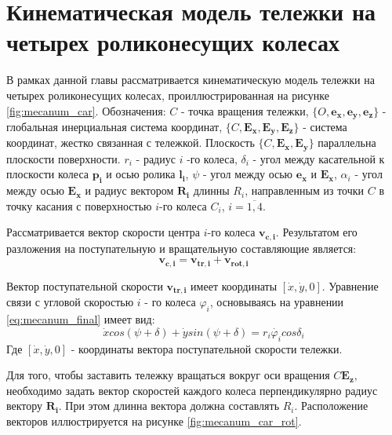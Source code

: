 \documentclass[oneside,final,14pt]{extreport}
\newcommand{\cmmnt}[1]{\ignorespaces}
\newcommand{\bs}{\boldsymbol}
\begin{document}
\chapter{Кинематическая модель тележки на четырех роликонесущих колесах}
В рамках данной главы рассматривается кинематическую модель тележки на четырех роликонесущих колесах, проиллюстрированная на рисунке  \ref{fig:mecanum_car}. Обозначения: $C$ - точка вращения тележки, $\{O,\bs{e_{x}},\bs{e_{y}},\bs{e_{z}}\}$ - глобальная инерциальная система координат, $\{C,\bs{E_{x}},\bs{E_{y}},\bs{E_{z}}\}$ - система координат, жестко связанная с тележкой. Плоскость $\{C,\bs{E_{x}},\bs{E_{y}}\}$ параллельна плоскости поверхности.  $r_{i}$ - радиус $i$ -го колеса, $\delta_{i}$ - угол между касательной к плоскости колеса $\bs{p_{i}}$ и осью ролика $\bs{l_{i}}$\cmmnt{, $\delta_{i} = \widehat{p_{i} l_{i}}$ }, $\psi$ - угол между осью $\bs{e_{x}}$ и $\bs{E_{x}}$\cmmnt{, $\psi$ = $\widehat{e_{x}E{x}}$}, $\alpha_{i}$ - угол между осью $\bs{E_{x}}$ и радиус вектором $\bs{R_{i}}$ длинны $R_{i}$, направленным из точки $C$ в точку касания с поверхностью $i$-го колеса $C_{i}$\cmmnt{,$\alpha_{i} = \widehat{E_{x}\overrightarrow{C C_{i}}}$}, $i=\overline{1,4}$. 

\begin{figure}[H]
\end{figure}

Рассматривается вектор скорости центра $i$-го колеса $\bs{v_{c,i}}$. Результатом его разложения на поступательную и вращательную составляющие является:
\begin{equation}
\label{eq:mec_wheel_v_decomp}
\bs{v_{c,i}}
=
\bs{v_{tr,i}}
+
\bs{v_{rot,i}}
\end{equation}

Вектор поступательной скорости $\bs{v_{tr,i}}$ имеет координаты $[\dot{x},\dot{y},0]$. Уравнение связи с угловой скоростью $i$ - го колеса $\varphi_{i}$, основываясь на уравнении \ref{eq:mecanum_final} имеет вид:
\begin{equation}
\dot{x}
cos(\psi+\delta)
+
\dot{y}
sin(\psi+\delta)
=
r_{i}\dot{\varphi_{i}}
cos\delta_{i}
\end{equation}
Где $[\dot{x},\dot{y},0]$ - координаты вектора поступательной скорости тележки.
 
Для того, чтобы заставить тележку вращаться вокруг оси вращения $C\bs{E_{z}}$, необходимо задать вектор скоростей каждого колеса перпендикулярно радиус вектору $\bs{R_{i}}$. При этом длинна вектора должна составлять $R_{i}$\cite{Saveliev}. Расположение векторов иллюстрируется на  рисунке \ref{fig:mecanum_car_rot}.
\end{document}
